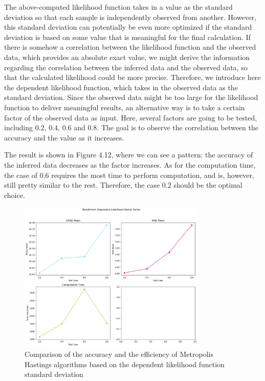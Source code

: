 The above-computed likelihood function takes in a value as the standard deviation so that each sample is independently observed from another. However, this standard deviation can potentially be even more optimized if the standard deviation is based on some value that is meaningful for the final calculation. If there is somehow a correlation between the likelihood function and the observed data, which provides an absolute exact value, we might derive the information regarding the correlation between the inferred data and the observed data, so that the calculated likelihood could be more precise. Therefore, we introduce here the dependent likelihood function, which takes in the observed data as the standard deviation. Since the observed data might be too large for the likelihood function to deliver meaningful results, an alternative way is to take a certain factor of the observed data as input. Here, several factors are going to be tested, including $0.2$, $0.4$, $0.6$ and $0.8$. The goal is to observe the correlation between the accuracy and the value as it increases.


The result is shown in Figure 4.12, where we can see a pattern: the accuracy of the inferred data decreases as the factor increases. As for the computation time, the case of $0.6$ requires the most time to perform computation, and is, however, still pretty similar to the rest. Therefore, the case $0.2$ should be the optimal choice.

\begin{figure}
    \centering
    \includegraphics[width=0.8\textwidth]{figures/basic_mh/benchmark/sensitivity_likelihood_dependent.png}
    \captionsetup{width=.8\textwidth}
    \caption{Comparison of the accuracy and the efficiency of Metropolis Hastings algorithms based on the dependent likelihood function standard deviation}
    \label{fig:enter-label}
\end{figure}


